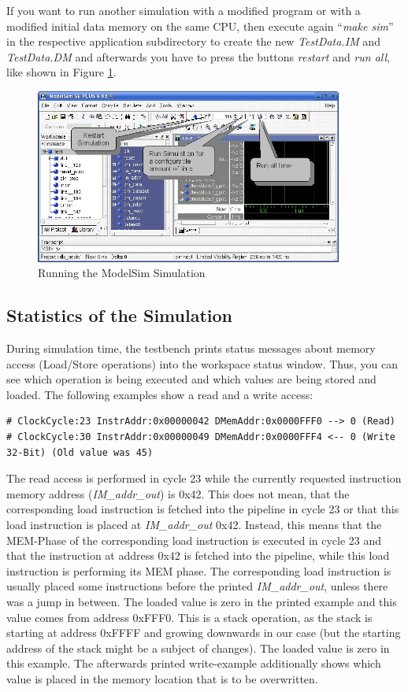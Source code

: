 If you want to run another simulation with a modified program or with a
modified initial data memory on the same CPU, then execute again
``\emph{make sim}'' in the respective application subdirectory to create
the new \emph{TestData.IM} and \emph{TestData.DM} and afterwards you
have to press the buttons \emph{restart} and \emph{run all}, like shown
in Figure \ref{fig:fig55}.
\begin{figure}[!htb]
	\centering
	\includegraphics[width=0.9\textwidth]{src/images/5-5.png}
	\caption{Running the ModelSim Simulation}
	\label{fig:fig55}
\end{figure}
\hypertarget{statistics-of-the-simulation}{%
\subsection{Statistics of the
Simulation}\label{statistics-of-the-simulation}}

During simulation time, the testbench prints status messages about
memory access (Load/Store operations) into the workspace status window.
Thus, you can see which operation is being executed and which values are
being stored and loaded. The following examples show a read and a write
access:
\begin{lstlisting}
# ClockCycle:23 InstrAddr:0x00000042 DMemAddr:0x0000FFF0 --> 0 (Read)
# ClockCycle:30 InstrAddr:0x00000049 DMemAddr:0x0000FFF4 <-- 0 (Write 32-Bit) (Old value was 45)
\end{lstlisting}
The read access is performed in cycle 23 while the currently requested
instruction memory address (\emph{IM\_addr\_out}) is 0x42. This does not
mean, that the corresponding load instruction is fetched into the
pipeline in cycle 23 or that this load instruction is placed at
\emph{IM\_addr\_out} 0x42. Instead, this means that the MEM-Phase of the
corresponding load instruction is executed in cycle 23 and that the
instruction at address 0x42 is fetched into the pipeline, while this
load instruction is performing its MEM phase. The corresponding load
instruction is usually placed some instructions before the printed
\emph{IM\_addr\_out}, unless there was a jump in between. The loaded
value is zero in the printed example and this value comes from address
0xFFF0. This is a stack operation, as the stack is starting at address
0xFFFF and growing downwards in our case (but the starting address of
the stack might be a subject of changes). The loaded value is zero in
this example. The afterwards printed write-example additionally shows
which value is placed in the memory location that is to be overwritten.

